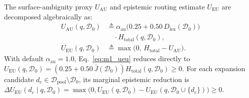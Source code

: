 \documentclass[11pt]{article}
\begin{document}
The surface-ambiguity proxy $U_{\text{AU}}$ and epistemic routing estimate $U_{\text{EU}}$ are decomposed algebraically as:
\begin{align}
U_{\text{AU}}(q, \mathcal{D}_0) &\triangleq \alpha_{\text{au}}\bigl(0.25 + 0.50 \, D_{\text{lex}}(\mathcal{D}_0)\bigr) \nonumber \\
&\quad \cdot H_{\text{total}}(q, \mathcal{D}_0), \label{eq:m1_uau} \\
U_{\text{EU}}(q, \mathcal{D}_0) &\triangleq \max\bigl(0, \, H_{\text{total}} - U_{\text{AU}}\bigr). \label{eq:m1_ueu}
\end{align}
With default $\alpha_{\text{au}} = 1.0$, Eq.~\eqref{eq:m1_ueu} reduces directly to $U_{\text{EU}}(q, \mathcal{D}_0) = (0.25 + 0.50 \, \bar{J}(\mathcal{D}_0)) H_{\text{total}}(q, \mathcal{D}_0) \ge 0$. For each expansion candidate $d_c \in \mathcal{D}_{\text{pool}} \setminus \mathcal{D}_0$, its marginal epistemic reduction is $\Delta U_{\text{EU}}(d_c \mid q, \mathcal{D}_0) = \max\bigl(0, U_{\text{EU}}(q, \mathcal{D}_0) - U_{\text{EU}}(q, \mathcal{D}_0 \cup \{d_c\})\bigr) \ge 0$.
\end{document}
